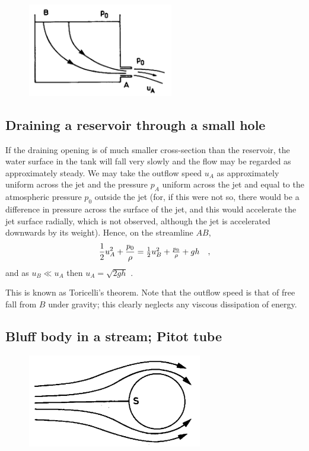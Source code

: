 \documentclass[twoside,a4paper,11pt]{report}
\begin{document}
\begin{figure}
\centerline{\includegraphics[width=2.5in]{Section31.pdf}}
\label{fig1}
\end{figure}

\subsection{Draining a reservoir through a small hole}
If the draining opening is of much smaller cross-section than the reservoir, 
the water surface in the tank will fall very slowly and the flow may be 
regarded as approximately steady. We may take the outflow speed $u_{A}$ as 
approximately uniform across the jet and the pressure $p_{A}$ uniform across 
the jet and equal to the atmospheric pressure $p_{0}$ outside the jet (for, 
if this were not so, there would be a difference in pressure across the 
surface of the jet, and this would accelerate the jet surface radially, 
which is not observed, although the jet is accelerated downwards by its 
weight). Hence, on the streamline $AB$,
\[
{1 \over 2}u_A^2 +\frac{p_0 }{\rho }=\textstyle{1 
\over 2}u_B ^2+\frac{p_0 }{\rho }+gh\quad ,
\]
and as $u_{B} \ll u_{A }$ then $u_A =\sqrt {2gh} $ .

This is known as Toricelli's theorem. Note that the outflow speed is that of 
free fall from $B$ under gravity; this clearly neglects any viscous 
dissipation of energy.

\subsection{Bluff body in a stream; Pitot tube}
\begin{figure}
\centerline{\includegraphics[width=3in]{Section32.pdf}}
\label{fig2}
\end{figure}
\end{document}
